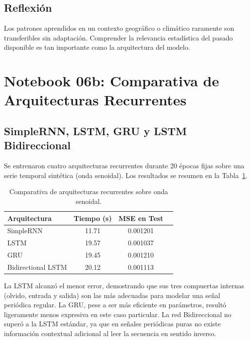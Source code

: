 \documentclass[12pt, a4paper]{article}
\begin{document}
\subsection{Reflexión}

Los patrones aprendidos en un contexto geográfico o climático raramente son transferibles sin adaptación. Comprender la relevancia estadística del pasado disponible es tan importante como la arquitectura del modelo.

\section{Notebook 06b: Comparativa de Arquitecturas Recurrentes}

\subsection{SimpleRNN, LSTM, GRU y LSTM Bidireccional}

Se entrenaron cuatro arquitecturas recurrentes durante 20 épocas fijas sobre una serie temporal sintética (onda senoidal). Los resultados se resumen en la Tabla~\ref{tab:rnn}.

\begin{table}[h!]
  \centering
  \caption{Comparativa de arquitecturas recurrentes sobre onda senoidal.}
  \label{tab:rnn}
  \begin{tabular}{lccc}
    \toprule
    \textbf{Arquitectura} & \textbf{Tiempo (s)} & \textbf{MSE en Test} \\
    \midrule
    SimpleRNN            & 11.71 & 0.001201 \\
    LSTM                 & 19.57 & 0.001037 \\
    GRU                  & 19.45 & 0.001210 \\
    Bidirectional LSTM   & 20.12 & 0.001113 \\
    \bottomrule
  \end{tabular}
\end{table}

La LSTM alcanzó el menor error, demostrando que sus tres compuertas internas (olvido, entrada y salida) son las más adecuadas para modelar una señal periódica regular. La GRU, pese a ser más eficiente en parámetros, resultó ligeramente menos expresiva en este caso particular. La red Bidireccional no superó a la LSTM estándar, ya que en señales periódicas puras no existe información contextual adicional al leer la secuencia en sentido inverso.
\end{document}
